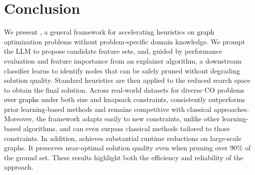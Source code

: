 \section{Conclusion} \label{section:conclusion}

We present \llm, a general framework for accelerating heuristics on \textcolor{black}{graph} optimization problems without problem-specific domain knowledge. We prompt the LLM to propose candidate feature sets, and, guided by performance evaluation and feature importance from an explainer algorithm, a downstream classifier learns to identify nodes that can be safely pruned without degrading solution quality. Standard heuristics are then applied to the reduced search space to obtain the final solution. Across real-world datasets for diverse CO problems \textcolor{black}{over graphs} under both size and knapsack constraints, \llm consistently outperforms prior learning-based methods and remains competitive with classical approaches. Moreover, the framework adapts easily to new constraints, unlike other learning-based algorithms, and can even surpass classical methods tailored to those constraints. In addition, \llm achieves substantial runtime reductions on large-scale graphs. It preserves near-optimal solution quality even when pruning over $90\%$ of the ground set. These results highlight both the efficiency and reliability of the approach.